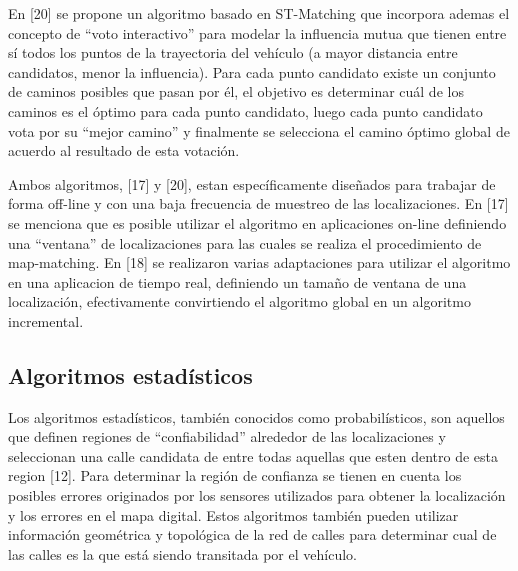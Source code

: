 \documentclass[final,fmstyle]{fpunathesis}
\begin{document}
En [20] se propone un algoritmo basado en ST-Matching que incorpora ademas el concepto de “voto interactivo” para modelar la influencia mutua que tienen entre sí todos los puntos de la trayectoria del vehículo (a mayor distancia entre candidatos, menor la influencia). Para cada punto candidato existe un conjunto de caminos posibles que pasan por él, el objetivo es determinar cuál de los caminos es el óptimo para cada punto candidato, luego cada punto candidato vota por su “mejor camino” y finalmente se selecciona el camino óptimo global de acuerdo al resultado de esta votación.

Ambos algoritmos, [17] y [20], estan específicamente diseñados para trabajar de forma off-line y con una baja frecuencia de muestreo de las localizaciones. En [17] se  menciona que es posible utilizar el algoritmo en aplicaciones on-line definiendo una “ventana” de localizaciones para las cuales se realiza el procedimiento de map-matching. En [18] se realizaron varias adaptaciones para utilizar el algoritmo en una aplicacion de tiempo real, definiendo un tamaño de ventana de una localización, efectivamente convirtiendo el algoritmo global en un algoritmo incremental.

\subsection{Algoritmos estadísticos}

Los algoritmos estadísticos, también conocidos como probabilísticos, son aquellos que definen regiones de “confiabilidad” alrededor de las localizaciones y seleccionan una calle candidata de entre todas aquellas que esten dentro de esta region [12]. Para determinar la región de confianza se tienen en cuenta los posibles errores originados por los sensores utilizados para obtener la localización y los errores en el mapa digital. Estos algoritmos también pueden utilizar información geométrica y topológica de la red de calles para determinar cual de las calles es la que está siendo transitada por el vehículo.
\end{document}

